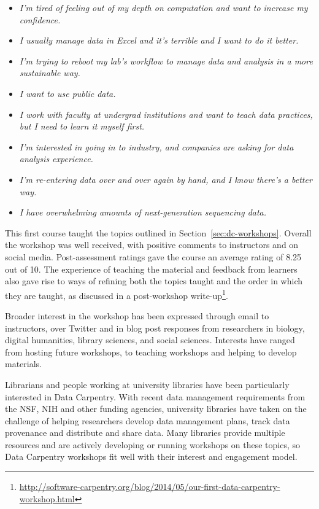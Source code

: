 \documentclass[11pt]{article}
\begin{document}
\begin{itemize}
\item \emph{I'm tired of feeling out of my depth on computation and want to increase my confidence.}
\item \emph{I usually manage data in Excel and it's terrible and I want to do it better.}
\item \emph{I'm trying to reboot my lab's workflow to manage data and analysis in a more sustainable way.}
\item \emph{I want to use public data.}
\item \emph{I work with faculty at undergrad institutions and want to teach data practices, but I need to learn it myself first.}
\item \emph{I'm interested in going in to industry, and companies are asking for data analysis experience.}
\item \emph{I'm re-entering data over and over again by hand, and I know there's a better way.}
\item \emph{I have overwhelming amounts of next-generation sequencing data.}
\end{itemize}

This first course taught the topics outlined in Section~\ref{sec:dc-workshops}. Overall the workshop was well received, with positive comments to instructors and on social media. Post-assessment ratings gave the course an average rating of 8.25 out of 10. The experience of teaching the material and feedback from learners also gave rise to ways of refining both the topics taught and the order in which they are taught, as discussed in a post-workshop write-up\footnote{\url{http://software-carpentry.org/blog/2014/05/our-first-data-carpentry-workshop.html}}.

Broader interest in the workshop has been expressed through email to instructors, over Twitter and in blog post responses from researchers in biology, digital humanities, library sciences, and social sciences.
Interests have  
ranged from hosting future workshops, to teaching workshops and helping to develop materials.

Librarians and people working at university libraries have been particularly interested in Data Carpentry. With recent data management requirements from the NSF, NIH and other funding agencies, university libraries have
taken on the challenge of helping researchers develop data management plans, track data provenance and 
distribute and share data. Many libraries provide multiple resources and are actively developing or running workshops
on these topics, so Data Carpentry workshops fit well with their interest and engagement model.
\end{document}
